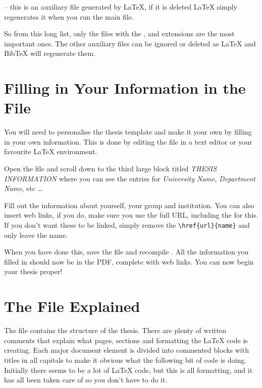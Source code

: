  -- this is an auxiliary file generated by \LaTeX{}, if it is deleted \LaTeX{} simply regenerates it when you run the main  file.

So from this long list, only the files with the ,  and  extensions are the most important ones. The other auxiliary files can be ignored or deleted as \LaTeX{} and BibTeX will regenerate them.


\section{Filling in Your Information in the  File}\label{FillingFile}

You will need to personalise the thesis template and make it your own by filling in your own information. This is done by editing the  file in a text editor or your favourite LaTeX environment.

Open the file and scroll down to the third large block titled \emph{THESIS INFORMATION} where you can see the entries for \emph{University Name}, \emph{Department Name}, etc \ldots

Fill out the information about yourself, your group and institution. You can also insert web links, if you do, make sure you use the full URL, including the  for this. If you don't want these to be linked, simply remove the \verb|\href{url}{name}| and only leave the name.

When you have done this, save the file and recompile . All the information you filled in should now be in the PDF, complete with web links. You can now begin your thesis proper!


\section{The  File Explained}

The  file contains the structure of the thesis. There are plenty of written comments that explain what pages, sections and formatting the \LaTeX{} code is creating. Each major document element is divided into commented blocks with titles in all capitals to make it obvious what the following bit of code is doing. Initially there seems to be a lot of \LaTeX{} code, but this is all formatting, and it has all been taken care of so you don't have to do it.

